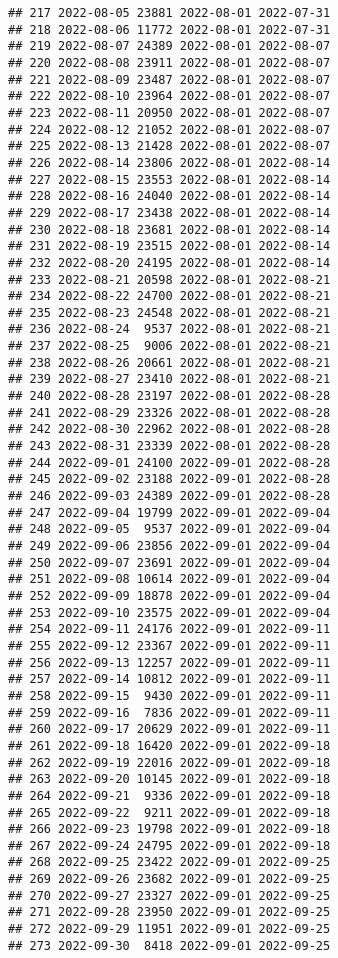 \documentclass[
]{article}
\begin{document}
\begin{verbatim}
## 217 2022-08-05 23881 2022-08-01 2022-07-31
## 218 2022-08-06 11772 2022-08-01 2022-07-31
## 219 2022-08-07 24389 2022-08-01 2022-08-07
## 220 2022-08-08 23911 2022-08-01 2022-08-07
## 221 2022-08-09 23487 2022-08-01 2022-08-07
## 222 2022-08-10 23964 2022-08-01 2022-08-07
## 223 2022-08-11 20950 2022-08-01 2022-08-07
## 224 2022-08-12 21052 2022-08-01 2022-08-07
## 225 2022-08-13 21428 2022-08-01 2022-08-07
## 226 2022-08-14 23806 2022-08-01 2022-08-14
## 227 2022-08-15 23553 2022-08-01 2022-08-14
## 228 2022-08-16 24040 2022-08-01 2022-08-14
## 229 2022-08-17 23438 2022-08-01 2022-08-14
## 230 2022-08-18 23681 2022-08-01 2022-08-14
## 231 2022-08-19 23515 2022-08-01 2022-08-14
## 232 2022-08-20 24195 2022-08-01 2022-08-14
## 233 2022-08-21 20598 2022-08-01 2022-08-21
## 234 2022-08-22 24700 2022-08-01 2022-08-21
## 235 2022-08-23 24548 2022-08-01 2022-08-21
## 236 2022-08-24  9537 2022-08-01 2022-08-21
## 237 2022-08-25  9006 2022-08-01 2022-08-21
## 238 2022-08-26 20661 2022-08-01 2022-08-21
## 239 2022-08-27 23410 2022-08-01 2022-08-21
## 240 2022-08-28 23197 2022-08-01 2022-08-28
## 241 2022-08-29 23326 2022-08-01 2022-08-28
## 242 2022-08-30 22962 2022-08-01 2022-08-28
## 243 2022-08-31 23339 2022-08-01 2022-08-28
## 244 2022-09-01 24100 2022-09-01 2022-08-28
## 245 2022-09-02 23188 2022-09-01 2022-08-28
## 246 2022-09-03 24389 2022-09-01 2022-08-28
## 247 2022-09-04 19799 2022-09-01 2022-09-04
## 248 2022-09-05  9537 2022-09-01 2022-09-04
## 249 2022-09-06 23856 2022-09-01 2022-09-04
## 250 2022-09-07 23691 2022-09-01 2022-09-04
## 251 2022-09-08 10614 2022-09-01 2022-09-04
## 252 2022-09-09 18878 2022-09-01 2022-09-04
## 253 2022-09-10 23575 2022-09-01 2022-09-04
## 254 2022-09-11 24176 2022-09-01 2022-09-11
## 255 2022-09-12 23367 2022-09-01 2022-09-11
## 256 2022-09-13 12257 2022-09-01 2022-09-11
## 257 2022-09-14 10812 2022-09-01 2022-09-11
## 258 2022-09-15  9430 2022-09-01 2022-09-11
## 259 2022-09-16  7836 2022-09-01 2022-09-11
## 260 2022-09-17 20629 2022-09-01 2022-09-11
## 261 2022-09-18 16420 2022-09-01 2022-09-18
## 262 2022-09-19 22016 2022-09-01 2022-09-18
## 263 2022-09-20 10145 2022-09-01 2022-09-18
## 264 2022-09-21  9336 2022-09-01 2022-09-18
## 265 2022-09-22  9211 2022-09-01 2022-09-18
## 266 2022-09-23 19798 2022-09-01 2022-09-18
## 267 2022-09-24 24795 2022-09-01 2022-09-18
## 268 2022-09-25 23422 2022-09-01 2022-09-25
## 269 2022-09-26 23682 2022-09-01 2022-09-25
## 270 2022-09-27 23327 2022-09-01 2022-09-25
## 271 2022-09-28 23950 2022-09-01 2022-09-25
## 272 2022-09-29 11951 2022-09-01 2022-09-25
## 273 2022-09-30  8418 2022-09-01 2022-09-25

\end{verbatim}
\end{document}
